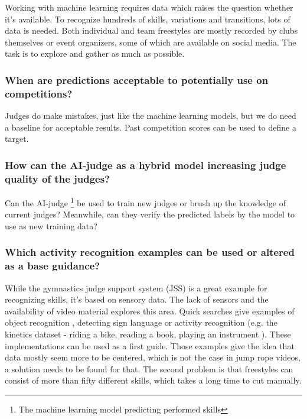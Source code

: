 Working with machine learning requires data which raises the question whether it's available. To recognize hundreds of skills, variations and transitions, lots of data is needed. Both individual and team freestyles are mostly recorded by clubs themselves or event organizers, some of which are available on social media. The task is to explore and gather as much as possible.

\subsubsection{When are predictions acceptable to potentially use on competitions?}
\label{subsubsec:intro-question-acceptable-results}

Judges do make mistakes, just like the machine learning models, but we do need a baseline for acceptable results. Past competition scores can be used to define a target.

\subsubsection{How can the AI-judge as a hybrid model increasing judge quality of the judges?}
\label{subsubsec:intro-question-hybrid-model-judge-quality}
Can the AI-judge \footnote{The machine learning model predicting performed skills} be used to train new judges or brush up the knowledge of current judges? Meanwhile, can they verify the predicted labels by the model to use as new training data?

\subsubsection{Which activity recognition examples can be used or altered as a base guidance?}
\label{subsubsec:intro-question-earlier-research-guidance}

While the gymnastics judge support system (JSS) is a great example for recognizing skills, it's based on sensory data. The lack of sensors and the availability of video material explores this area.
Quick searches give examples of object recognition \autocite{Diwaker_2022}, detecting sign language \autocite{Bora_2023} or activity recognition (e.g. the kinetics dataset - riding a bike, reading a book, playing an instrument \autocite{Kay_2017}).
These implementations can be used as a first guide.
Those examples give the idea that data mostly seem more to be centered, which is not the case in jump rope videos, a solution needs to be found for that. The second problem is that freestyles can consist of more than fifty different skills, which takes a long time to cut manually.

